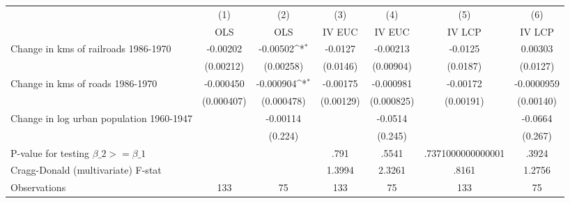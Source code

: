 {
\def\sym#1{\ifmmode^{#1}\else\(^{#1}\)\fi}
\begin{tabular}{l*{6}{c}}
\hline\hline
                &\multicolumn{1}{c}{(1)}&\multicolumn{1}{c}{(2)}&\multicolumn{1}{c}{(3)}&\multicolumn{1}{c}{(4)}&\multicolumn{1}{c}{(5)}&\multicolumn{1}{c}{(6)}\\
                &\multicolumn{1}{c}{OLS}&\multicolumn{1}{c}{OLS}&\multicolumn{1}{c}{IV EUC}&\multicolumn{1}{c}{IV EUC}&\multicolumn{1}{c}{IV LCP}&\multicolumn{1}{c}{IV LCP}\\
\hline
Change in kms of railroads 1986-1970& -0.00202         & -0.00502\sym{*}  &  -0.0127         & -0.00213         &  -0.0125         &  0.00303         \\
                &(0.00212)         &(0.00258)         & (0.0146)         &(0.00904)         & (0.0187)         & (0.0127)         \\
[1em]
Change in kms of roads 1986-1970&-0.000450         &-0.000904\sym{*}  & -0.00175         &-0.000981         & -0.00172         &-0.0000959         \\
                &(0.000407)         &(0.000478)         &(0.00129)         &(0.000825)         &(0.00191)         &(0.00140)         \\
[1em]
Change in log urban population 1960-1947&                  & -0.00114         &                  &  -0.0514         &                  &  -0.0664         \\
                &                  &  (0.224)         &                  &  (0.245)         &                  &  (0.267)         \\
\hline
P-value for testing $\beta\_{2} >= \beta\_{1}$&                  &                  &     .791         &    .5541         &.7371000000000001         &    .3924         \\
Cragg-Donald (multivariate) F-stat&                  &                  &   1.3994         &   2.3261         &    .8161         &   1.2756         \\
Observations    &      133         &       75         &      133         &       75         &      133         &       75         \\
\hline\hline
\end{tabular}
}
